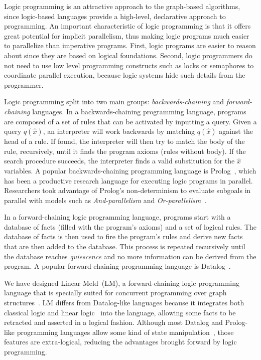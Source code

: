 \documentclass{sigplanconf}
\begin{document}
Logic programming is an attractive approach to the graph-based algorithms,
since logic-based languages provide a high-level, declarative approach
to programming. An important characteristic of logic programming is
that it offers great potential for implicit parallelism, thus making
logic programs much easier to parallelize than imperative
programs. First, logic programs are easier to reason about since they
are based on logical foundations. Second, logic programmers do not
need to use low level programming constructs such as locks or
semaphores to coordinate parallel execution, because logic systems
hide such details from the programmer.

Logic programming split into two main groups:
\emph{backwards-chaining} and \emph{forward-chaining} languages. In a
backwards-chaining programming language, programs are composed of a
set of rules that can be activated by inputting a query. Given a query
$q(\hat{x})$, an interpreter will work backwards by matching
$q(\hat{x})$ against the head of a rule. If found, the interpreter
will then try to match the body of the rule, recursively, until it
finds the program axioms (rules without body). If the search procedure
succeeds, the interpreter finds a valid substitution for the $\hat{x}$
variables. A popular backwards-chaining programming language is
Prolog~\cite{Colmerauer:1993:BP:154766.155362}, which has been a
productive research language for executing logic programs in
parallel. Researchers took advantage of Prolog's non-determinism to
evaluate subgoals in parallel with models such as
\emph{And-parallelism} and
\emph{Or-parallelism}~\cite{Gupta:2001:PEP:504083.504085}.

In a forward-chaining logic programming language, programs start with
a database of facts (filled with the program's axioms) and a set of
logical rules. The database of facts is then used to fire the
program's rules and derive new facts that are then added to the
database. This process is repeated recursively until the database
reaches \emph{quiescence} and no more information can be derived from
the program. A popular forward-chaining programming language is
Datalog~\cite{Ramakrishnan93asurvey}.

We have designed Linear Meld~(LM), a forward-chaining logic programming
language that is specially suited for
concurrent programming over graph structures~\cite{cruz-iclp14}. LM
differs from Datalog-like languages because it integrates both
classical logic and linear logic~\cite{girard-87} into the language, allowing some
facts to be retracted and asserted in a logical fashion. Although most
Datalog and Prolog-like programming languages allow some kind of state
manipulation~\cite{Liu98extendingdatalog}, those features are
extra-logical, reducing the advantages brought forward by logic programming.
\end{document}
